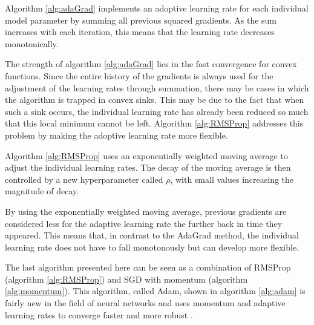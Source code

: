 \begin{remark}
	Algorithm \ref{alg:adaGrad} implements an adoptive learning rate for each individual model parameter by summing all previous squared gradients. As the sum increases with each iteration, this means that the learning rate decreases monotonically.
\end{remark}

The strength of algorithm \ref{alg:adaGrad} lies in the fast convergence for convex functions. Since the entire history of the gradients is always used for the adjustment of the learning rates through summation, there may be cases in which the algorithm is trapped in convex sinks. This may be due to the fact that when such a sink occurs, the individual learning rate has already been reduced so much that this local minimum cannot be left. 
Algorithm \ref{alg:RMSProp} addresses this problem by making the adoptive learning rate more flexible.

\begin{remark}	
	Algorithm \ref{alg:RMSProp} uses an exponentially weighted moving average to adjust the individual learning rates. The decay of the moving average is then controlled by a new hyperparameter called $\rho$, with small values increasing the magnitude of decay.
\end{remark}

By using the exponentially weighted moving average, previous gradients are considered less for the adaptive learning rate the further back in time they appeared. This means that, in contrast to the AdaGrad method, the individual learning rate does not have to fall monotonously but can develop more flexible. 

The last algorithm presented here can be seen as a combination of RMSProp (algorithm \ref{alg:RMSProp}) and SGD with momentum (algorithm \ref{alg:momentum}). This algorithm, called Adam, shown in algorithm \ref{alg:adam} is fairly new in the field of neural networks and uses momentum and adaptive learning rates to converge faster and more robust \cite{kingma2014adam}. 

